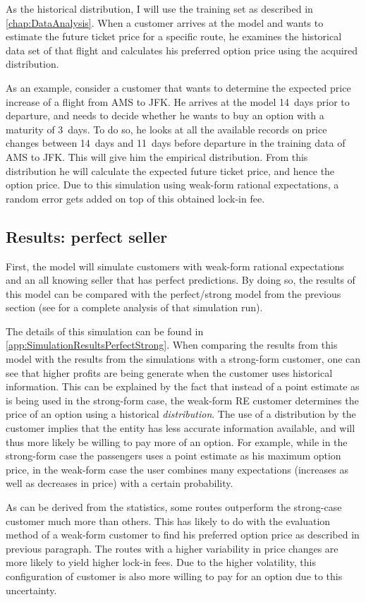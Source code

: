 As the historical distribution, I will use the training set as described in \autoref{chap:DataAnalysis}. When a customer arrives at the model and wants to estimate the future ticket price for a specific route, he examines the historical data set of that flight and calculates his preferred option price using the acquired distribution.

As an example, consider a customer that wants to determine the expected price increase of a flight from AMS to JFK. He arrives at the model 14~days prior to departure, and needs to decide whether he wants to buy an option with a maturity of 3~days. To do so, he looks at all the available records on price changes between 14~days and 11~days before departure in the training data of AMS to JFK. This will give him the empirical distribution. From this distribution he will calculate the expected future ticket price, and hence the option price. Due to this simulation using weak-form rational expectations, a random error gets added on top of this obtained lock-in fee.

\subsection{Results: perfect seller}
First, the model will simulate customers with weak-form rational expectations and an all knowing seller that has perfect predictions. By doing so, the results of this model can be compared with the perfect/strong model from the previous section (see  for a complete analysis of that simulation run).

The details of this simulation can be found in \autoref{app:SimulationResultsPerfectStrong}. When comparing the results from this model with the results from the simulations with a strong-form customer, one can see that higher profits are being generate when the customer uses historical information. This can be explained by the fact that instead of a point estimate as is being used in the strong-form case, the weak-form RE customer determines the price of an option using a historical \emph{distribution}. The use of a distribution by the customer implies that the entity has less accurate information available, and will thus more likely be willing to pay more of an option. For example, while in the strong-form case the passengers uses a point estimate as his maximum option price, in the weak-form case the user combines many expectations (increases as well as decreases in price) with a certain probability.

As can be derived from the statistics, some routes outperform the strong-case customer much more than others. This has likely to do with the evaluation method of a weak-form customer to find his preferred option price as described in previous paragraph. The routes with a higher variability in price changes are more likely to yield higher lock-in fees. Due to the higher volatility, this configuration of customer is also more willing to pay for an option due to this uncertainty.

